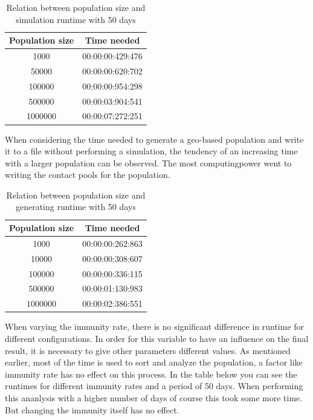 \documentclass[runningheads]{llncs}
\begin{document}
\begin{table}
	\caption{Relation between population size and simulation runtime with 50 days}
\begin{center}
	\begin{tabular}{ | c | c |}
		\hline
		Population size & Time needed \\ \hline
		1000 & 00:00:00:429:476 \\ \hline
		50000 & 00:00:00:620:702 \\ \hline
		100000 & 00:00:00:954:298 \\ \hline
		500000 & 00:00:03:904:541 \\ \hline
		1000000 & 00:00:07:272:251 \\
		\hline	
	\end{tabular}
\end{center} 
\end{table}
\newpage
\noindent
When considering the time needed to generate a geo-based population and write it to a file without performing a simulation, the tendency of an increasing time with a larger population can be observed. The most computingpower went to writing the contact pools for the population.
\begin{table}
	\caption{Relation between population size and generating runtime with 50 days}
	\begin{center}
		\begin{tabular}{ | c | c |}
			\hline
			Population size & Time needed \\ \hline
			1000 & 00:00:00:262:863 \\ \hline
			10000 & 00:00:00:308:607 \\ \hline
			100000 & 00:00:00:336:115 \\ \hline
			500000 & 00:00:01:130:983 \\ \hline
			1000000 & 00:00:02:386:551 \\
			\hline
		\end{tabular}
	\end{center}
\end{table}

\noindent
When varying the immunity rate, there is no significant difference in runtime for different configurations. In order for this variable to have an influence on the final result, it is necessary to give other parameters different values.  As mentioned earlier, most of the time is used to sort and analyze the population, a factor like immunity rate has no effect on this process. In the table below you can see the runtimes for different immunity rates and a period of 50 days. When performing this ananlysis with a higher number of days of course this took some more time. But changing the immunity itself has no effect.
\end{document}
